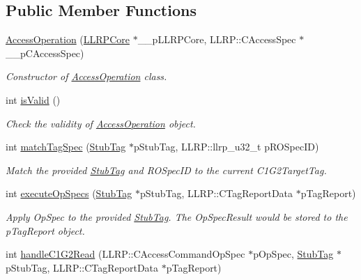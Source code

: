 \subsection*{Public Member Functions}
\begin{DoxyCompactItemize}
\item 
\hyperlink{class_e_l_f_i_n_1_1_access_operation_ac2138a56bbd039b4d5c2354ddda25992}{Access\-Operation} (\hyperlink{class_e_l_f_i_n_1_1_l_l_r_p_core}{L\-L\-R\-P\-Core} $\ast$\-\_\-\-\_\-p\-L\-L\-R\-P\-Core, L\-L\-R\-P\-::\-C\-Access\-Spec $\ast$\-\_\-\-\_\-p\-C\-Access\-Spec)
\begin{DoxyCompactList}\small\item\em Constructor of \hyperlink{class_e_l_f_i_n_1_1_access_operation}{Access\-Operation} class. \end{DoxyCompactList}\item 
int \hyperlink{class_e_l_f_i_n_1_1_access_operation_abd6ee0b2cb143103440bd9caed9dff19}{is\-Valid} ()
\begin{DoxyCompactList}\small\item\em Check the validity of \hyperlink{class_e_l_f_i_n_1_1_access_operation}{Access\-Operation} object. \end{DoxyCompactList}\item 
int \hyperlink{class_e_l_f_i_n_1_1_access_operation_a9f928363dd0ab1a6a0ef2f3e594e60a4}{match\-Tag\-Spec} (\hyperlink{class_e_l_f_i_n_1_1_stub_tag}{Stub\-Tag} $\ast$p\-Stub\-Tag, L\-L\-R\-P\-::llrp\-\_\-u32\-\_\-t p\-R\-O\-Spec\-I\-D)
\begin{DoxyCompactList}\small\item\em Match the provided \hyperlink{class_e_l_f_i_n_1_1_stub_tag}{Stub\-Tag} and R\-O\-Spec\-I\-D to the current C1\-G2\-Target\-Tag. \end{DoxyCompactList}\item 
int \hyperlink{class_e_l_f_i_n_1_1_access_operation_a7b21dfebb3248fe9e4105c8dca4ce897}{execute\-Op\-Specs} (\hyperlink{class_e_l_f_i_n_1_1_stub_tag}{Stub\-Tag} $\ast$p\-Stub\-Tag, L\-L\-R\-P\-::\-C\-Tag\-Report\-Data $\ast$p\-Tag\-Report)
\begin{DoxyCompactList}\small\item\em Apply Op\-Spec to the provided \hyperlink{class_e_l_f_i_n_1_1_stub_tag}{Stub\-Tag}. The Op\-Spec\-Result would be stored to the p\-Tag\-Report object. \end{DoxyCompactList}\item 
int \hyperlink{class_e_l_f_i_n_1_1_access_operation_af944ff98cc959755f16f892ef1be7559}{handle\-C1\-G2\-Read} (L\-L\-R\-P\-::\-C\-Access\-Command\-Op\-Spec $\ast$p\-Op\-Spec, \hyperlink{class_e_l_f_i_n_1_1_stub_tag}{Stub\-Tag} $\ast$p\-Stub\-Tag, L\-L\-R\-P\-::\-C\-Tag\-Report\-Data $\ast$p\-Tag\-Report)

\end{DoxyCompactItemize}
